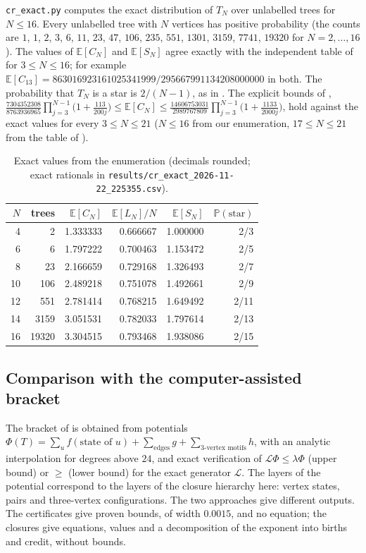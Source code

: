 \documentclass[11pt]{article}
\theoremstyle{plain}
\theoremstyle{definition}
\theoremstyle{remark}
\begin{document}
\texttt{cr\_exact.py} computes the exact distribution of $T_N$ over unlabelled trees for $N\le16$. Every unlabelled tree with $N$ vertices has positive probability (the counts are $1$, $1$, $2$, $3$, $6$, $11$, $23$, $47$, $106$, $235$, $551$, $1301$, $3159$, $7741$, $19320$ for $N=2,\dots,16$). The values of $\mathbb{E}[C_N]$ and $\mathbb{E}[S_N]$ agree exactly with the independent table of \cite{Uzay2026} for $3\le N\le16$; for example $\mathbb{E}[C_{13}]=863016923161025341999/295667991134208000000$ in both. The probability that $T_N$ is a star is $2/(N-1)$, as in \cite[(A4)]{HKRZ2026}. The explicit bounds of \cite[\texttt{proofs/bracket-motifs.md}, Theorem~1]{Uzay2026}, $\frac{7304352308}{8763936965}\prod_{j=3}^{N-1}\bigl(1+\frac{113}{200j}\bigr)\le\mathbb{E}[C_N]\le\frac{14606753031}{2989767809}\prod_{j=3}^{N-1}\bigl(1+\frac{1133}{2000j}\bigr)$, hold against the exact values for every $3\le N\le21$ ($N\le16$ from our enumeration, $17\le N\le21$ from the table of \cite{Uzay2026}).

\begin{table}[h]
\centering
\begin{tabular}{rrrrrr}
\toprule
$N$ & trees & $\mathbb{E}[C_N]$ & $\mathbb{E}[L_N]/N$ & $\mathbb{E}[S_N]$ & $\mathbb{P}(\text{star})$\\
\midrule
4 & 2 & 1.333333 & 0.666667 & 1.000000 & 2/3\\
6 & 6 & 1.797222 & 0.700463 & 1.153472 & 2/5\\
8 & 23 & 2.166659 & 0.729168 & 1.326493 & 2/7\\
10 & 106 & 2.489218 & 0.751078 & 1.492661 & 2/9\\
12 & 551 & 2.781414 & 0.768215 & 1.649492 & 2/11\\
14 & 3159 & 3.051531 & 0.782033 & 1.797614 & 2/13\\
16 & 19320 & 3.304515 & 0.793468 & 1.938086 & 2/15\\
\bottomrule
\end{tabular}
\caption{Exact values from the enumeration (decimals rounded; exact rationals in \texttt{results/cr\_exact\_2026-11-22\_225355.csv}).}
\end{table}


\subsection*{Comparison with the computer-assisted bracket}
The bracket of \cite{Uzay2026} is obtained from potentials $\Phi(T)=\sum_uf(\text{state of }u)+\sum_{\text{edges}}g+\sum_{\text{3-vertex motifs}}h$, with an analytic interpolation for degrees above $24$, and exact verification of $\mathcal{L}\Phi\le\lambda\Phi$ (upper bound) or $\ge$ (lower bound) for the exact generator $\mathcal{L}$. The layers of the potential correspond to the layers of the closure hierarchy here: vertex states, pairs and three-vertex configurations. The two approaches give different outputs. The certificates give proven bounds, of width $0.0015$, and no equation; the closures give equations, values and a decomposition of the exponent into births and credit, without bounds.
\end{document}
